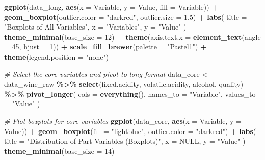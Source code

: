 \documentclass[
  doc,floatsintext]{apa6}
\newenvironment{Shaded}{\begin{snugshade}}{\end{snugshade}}
\newcommand{\AttributeTok}[1]{\textcolor[rgb]{0.13,0.29,0.53}{#1}}
\newcommand{\CommentTok}[1]{\textcolor[rgb]{0.56,0.35,0.01}{\textit{#1}}}
\newcommand{\ConstantTok}[1]{\textcolor[rgb]{0.56,0.35,0.01}{#1}}
\newcommand{\DecValTok}[1]{\textcolor[rgb]{0.00,0.00,0.81}{#1}}
\newcommand{\FloatTok}[1]{\textcolor[rgb]{0.00,0.00,0.81}{#1}}
\newcommand{\FunctionTok}[1]{\textcolor[rgb]{0.13,0.29,0.53}{\textbf{#1}}}
\newcommand{\NormalTok}[1]{#1}
\newcommand{\OtherTok}[1]{\textcolor[rgb]{0.56,0.35,0.01}{#1}}
\newcommand{\SpecialCharTok}[1]{\textcolor[rgb]{0.81,0.36,0.00}{\textbf{#1}}}
\newcommand{\StringTok}[1]{\textcolor[rgb]{0.31,0.60,0.02}{#1}}
\begin{document}
\begin{Shaded}
\begin{Highlighting}[]
\FunctionTok{ggplot}\NormalTok{(data\_long, }\FunctionTok{aes}\NormalTok{(}\AttributeTok{x =}\NormalTok{ Variable, }\AttributeTok{y =}\NormalTok{ Value, }\AttributeTok{fill =}\NormalTok{ Variable)) }\SpecialCharTok{+}
  \FunctionTok{geom\_boxplot}\NormalTok{(}\AttributeTok{outlier.color =} \StringTok{"darkred"}\NormalTok{, }\AttributeTok{outlier.size =} \FloatTok{1.5}\NormalTok{) }\SpecialCharTok{+}
  \FunctionTok{labs}\NormalTok{(}
    \AttributeTok{title =} \StringTok{"Boxplots of All Variables"}\NormalTok{,}
    \AttributeTok{x =} \StringTok{"Variables"}\NormalTok{,}
    \AttributeTok{y =} \StringTok{"Value"}
\NormalTok{  ) }\SpecialCharTok{+}
  \FunctionTok{theme\_minimal}\NormalTok{(}\AttributeTok{base\_size =} \DecValTok{12}\NormalTok{) }\SpecialCharTok{+}
  \FunctionTok{theme}\NormalTok{(}\AttributeTok{axis.text.x =} \FunctionTok{element\_text}\NormalTok{(}\AttributeTok{angle =} \DecValTok{45}\NormalTok{, }\AttributeTok{hjust =} \DecValTok{1}\NormalTok{)) }\SpecialCharTok{+}
  \FunctionTok{scale\_fill\_brewer}\NormalTok{(}\AttributeTok{palette =} \StringTok{"Pastel1"}\NormalTok{) }\SpecialCharTok{+}
  \FunctionTok{theme}\NormalTok{(}\AttributeTok{legend.position =} \StringTok{"none"}\NormalTok{)}


\CommentTok{\# Select the core variables and pivot to long format}
\NormalTok{data\_core }\OtherTok{\textless{}{-}}\NormalTok{ data\_wine\_raw }\SpecialCharTok{\%\textgreater{}\%}
  \FunctionTok{select}\NormalTok{(fixed.acidity, volatile.acidity, alcohol, quality) }\SpecialCharTok{\%\textgreater{}\%}
  \FunctionTok{pivot\_longer}\NormalTok{(}
    \AttributeTok{cols =} \FunctionTok{everything}\NormalTok{(),}
    \AttributeTok{names\_to  =} \StringTok{"Variable"}\NormalTok{,}
    \AttributeTok{values\_to =} \StringTok{"Value"}
\NormalTok{  )}

\CommentTok{\# Plot boxplots for core variables}
\FunctionTok{ggplot}\NormalTok{(data\_core, }\FunctionTok{aes}\NormalTok{(}\AttributeTok{x =}\NormalTok{ Variable, }\AttributeTok{y =}\NormalTok{ Value)) }\SpecialCharTok{+}
  \FunctionTok{geom\_boxplot}\NormalTok{(}\AttributeTok{fill =} \StringTok{"lightblue"}\NormalTok{, }\AttributeTok{outlier.color =} \StringTok{"darkred"}\NormalTok{) }\SpecialCharTok{+}
  \FunctionTok{labs}\NormalTok{(}
    \AttributeTok{title =} \StringTok{"Distribution of Part Variables (Boxplots)"}\NormalTok{,}
    \AttributeTok{x     =} \ConstantTok{NULL}\NormalTok{,}
    \AttributeTok{y     =} \StringTok{"Value"}
\NormalTok{  ) }\SpecialCharTok{+}
  \FunctionTok{theme\_minimal}\NormalTok{(}\AttributeTok{base\_size =} \DecValTok{14}\NormalTok{)}


\end{Highlighting}
\end{Shaded}
\end{document}
